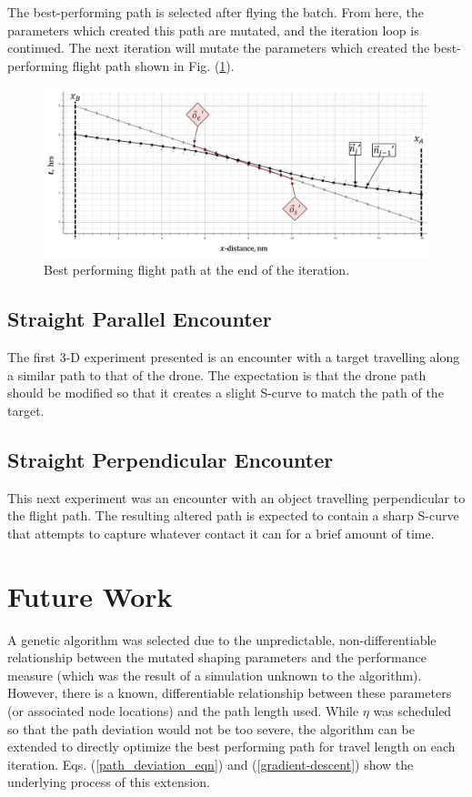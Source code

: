 \documentclass[conf]{new-aiaa}
\begin{document}
The best-performing path is selected after flying the batch. From here, the parameters which created this path are mutated, and the iteration loop is continued. The next iteration will mutate the parameters which created the best-performing flight path shown in Fig. (\ref{end-result-2d}).

\begin{figure}[hbt!]
\centering
\includegraphics[width=1\textwidth]{figs/end-result}
\caption{Best performing flight path at the end of the iteration.}
\label{end-result-2d}
\end{figure}

\subsection{Straight Parallel Encounter}
The first 3-D experiment presented is an encounter with a target travelling along a similar path to that of the drone. The expectation is that the drone path should be modified so that it creates a slight S-curve to match the path of the target.

\subsection{Straight Perpendicular Encounter}
This next experiment was an encounter with an object travelling perpendicular to the flight path. The resulting altered path is expected to contain a sharp S-curve that attempts to capture whatever contact it can for a brief amount of time.


\section{Future Work}
A genetic algorithm was selected due to the unpredictable, non-differentiable relationship between the mutated shaping parameters and the performance measure (which was the result of a simulation unknown to the algorithm). However, there is a known, differentiable relationship between these parameters (or associated node locations) and the path length used. While $\eta$ was scheduled so that the path deviation would not be too severe, the algorithm can be extended to directly optimize the best performing path for travel length on each iteration. Eqs. (\ref{path_deviation_eqn}) and (\ref{gradient-descent}) show the underlying process of this extension.
\end{document}
